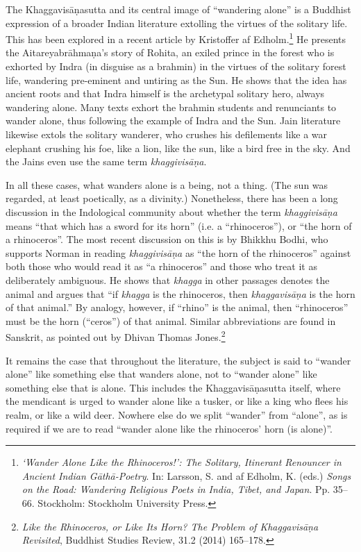 \documentclass[12pt,openany]{book}%
\begin{document}
The \textsanskrit{Khaggavisāṇasutta} and its central image of “wandering alone” is a Buddhist expression of a broader Indian literature extolling the virtues of the solitary life. This has been explored in a recent article by Kristoffer af Edholm.\footnote{\textit{‘Wander Alone Like the Rhinoceros!’: The Solitary, Itinerant Renouncer in Ancient Indian \textsanskrit{Gāthā}-Poetry}. In: Larsson, S. and af Edholm, K. (eds.) \textit{Songs on the Road: Wandering Religious Poets in India, Tibet, and Japan}. Pp. 35–66. Stockholm: Stockholm University Press. } He presents the \textsanskrit{Aitareyabrāhmaṇa}’s story of Rohita, an exiled prince in the forest who is exhorted by Indra (in disguise as a brahmin) in the virtues of the solitary forest life, wandering pre-eminent and untiring as the Sun. He shows that the idea has ancient roots and that Indra himself is the archetypal solitary hero, always wandering alone. Many texts exhort the brahmin students and renunciants to wander alone, thus following the example of Indra and the Sun. Jain literature likewise extols the solitary wanderer, who crushes his defilements like a war elephant crushing his foe, like a lion, like the sun, like a bird free in the sky. And the Jains even use the same term \textit{\textsanskrit{khaggivisāṇa}}.

In all these cases, what wanders alone is a being, not a thing. (The sun was regarded, at least poetically, as a divinity.) Nonetheless, there has been a long discussion in the Indological community about whether the term \textit{\textsanskrit{khaggivisāṇa}} means “that which has a sword for its horn” (i.e. a “rhinoceros”), or “the horn of a rhinoceros”. The most recent discussion on this is by Bhikkhu Bodhi, who supports Norman in reading \textit{\textsanskrit{khaggivisāṇa}} as “the horn of the rhinoceros” against both those who would read it as “a rhinoceros” and those who treat it as deliberately ambiguous. He shows that \textit{khagga} in other passages denotes the animal and argues that “if \textit{khagga} is the rhinoceros, then \textit{\textsanskrit{khaggavisāṇa}} is the horn of that animal.” By analogy, however, if “rhino” is the animal, then “rhinoceros” must be the horn (“ceros”) of that animal. Similar abbreviations are found in Sanskrit, as pointed out by Dhivan Thomas Jones.\footnote{\textit{Like the Rhinoceros, or Like Its Horn? The Problem of \textsanskrit{Khaggavisāṇa} Revisited}, Buddhist Studies Review, 31.2 (2014) 165–178. }

It remains the case that throughout the literature, the subject is said to “wander alone” like something else that wanders alone, not to “wander alone” like something else that is alone. This includes the \textsanskrit{Khaggavisāṇasutta} itself, where the mendicant is urged to wander alone like a tusker, or like a king who flees his realm, or like a wild deer. Nowhere else do we split “wander” from “alone”, as is required if we are to read “wander alone like the rhinoceros’ horn (is alone)”.
\end{document}
